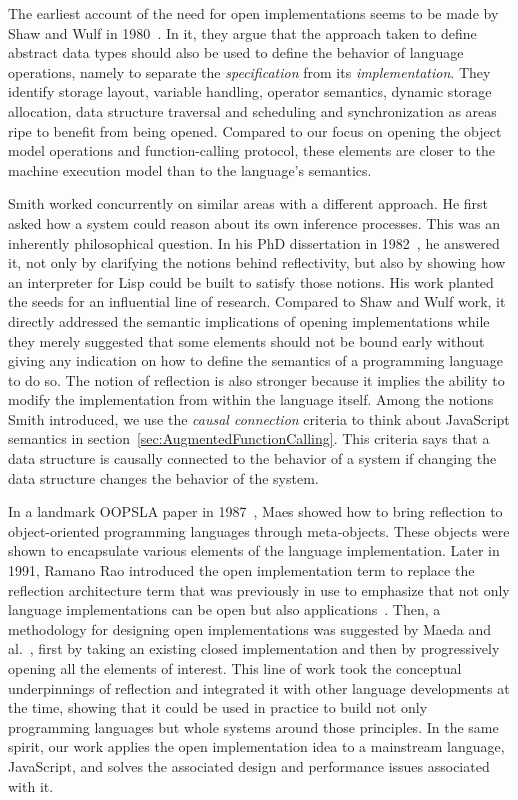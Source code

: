 The earliest account of the need for open implementations seems to be made by
Shaw and Wulf in 1980~\cite{Shaw:1980}. In it, they argue that the approach
taken to define abstract data types should also be used to define the behavior
of language operations, namely to separate the \textit{specification} from its
\textit{implementation}. They identify storage layout, variable handling,
operator semantics, dynamic storage allocation, data structure traversal and
scheduling and synchronization as areas ripe to benefit from being opened.
Compared to our focus on opening the object model operations and
function-calling protocol, these elements are closer to the machine execution
model than to the language's semantics. 

Smith worked concurrently on similar areas with a different approach. He first
asked how a system could reason about its own inference processes. This was an
inherently philosophical question. In his PhD dissertation in
1982~\cite{Smith:1982}, he answered it, not only by clarifying the notions
behind reflectivity, but also by showing how an interpreter for Lisp could be
built to satisfy those notions. His work planted the seeds for an influential
line of research. Compared to Shaw and Wulf work, it directly addressed the
semantic implications of opening implementations while they merely suggested
that some elements should not be bound early without giving any indication on
how to define the semantics of a programming language to do so.  The notion of
reflection is also stronger because it implies the ability to modify the
implementation from within the language itself. Among the notions Smith
introduced, we use the \textit{causal connection} criteria to think about
JavaScript semantics in section~\ref{sec:AugmentedFunctionCalling}. This
criteria says that a data structure is causally connected to the behavior of a
system if changing the data structure changes the behavior of the system.

In a landmark OOPSLA paper in 1987~\cite{Maes:1987}, Maes showed how to bring
reflection to object-oriented programming languages through meta-objects.
These objects were shown to encapsulate various elements of the language
implementation. Later in 1991, Ramano Rao introduced the open implementation
term to replace the reflection architecture term that was previously in use to
emphasize that not only language implementations can be open but also
applications~\cite{Rao:1991}. Then, a methodology for designing open
implementations was suggested by Maeda and al.~\cite{Maeda:1997}, first by
taking an existing closed implementation and then by progressively opening all
the elements of interest. This line of work took the conceptual underpinnings
of reflection and integrated it with other language developments at the time,
showing that it could be used in practice to build not only programming
languages but whole systems around those principles. In the same spirit, our
work applies the open implementation idea to a mainstream language, JavaScript,
and solves the associated design and performance issues associated with it.

